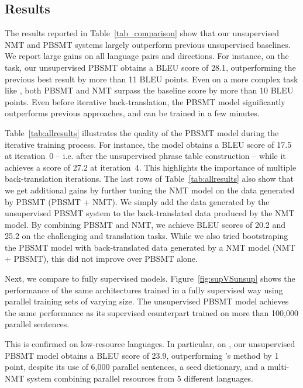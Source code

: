 \documentclass[11pt,a4paper]{article}
\begin{document}
\subsection{Results} \label{sec:results}

\insertmodelcomparisontable

\insertallresults
The results reported in Table~\ref{tab_comparison} show that our unsupervised NMT and PBSMT systems largely outperform previous unsupervised baselines. We report large gains on all language pairs and directions. For instance, on the  task, our unsupervised PBSMT obtains a BLEU score of 28.1, outperforming the previous best result by more than 11 BLEU points. Even on a more complex task like , both PBSMT and NMT surpass the baseline score by more than 10 BLEU points. Even before iterative back-translation, the PBSMT model significantly outperforms previous approaches, and can be trained in a few minutes.

Table~\ref{tab:allresults} illustrates the quality of the PBSMT model during the iterative training process. For instance, 
the  model obtains a BLEU score of 17.5 at iteration~0 -- i.e. after the unsupervised phrase table construction -- while it achieves a score of 27.2 at iteration~4. This highlights the importance of multiple back-translation iterations. The last rows of Table~\ref{tab:allresults} also show that we get additional gains by further tuning the NMT model on the data generated by PBSMT (PBSMT + NMT). We simply add the data generated by the unsupervised PBSMT system to the back-translated data produced by the NMT model. By combining PBSMT and NMT, we achieve BLEU scores of 20.2 and 25.2 on the challenging  and  translation tasks. While we also tried bootstraping the PBSMT model with back-translated data generated by a NMT model (NMT + PBSMT), this did not improve over PBSMT alone.

Next, we compare to fully supervised models. Figure~\ref{fig:supVSunsup} shows the performance of the same architectures trained in a fully supervised way using parallel training sets of varying size. The unsupervised PBSMT model achieves the same performance as its supervised counterpart trained on more than 100,000 parallel sentences.

This is confirmed on low-resource languages.
In particular, on , our unsupervised PBSMT model obtains a BLEU score of 23.9, outperforming \citet{gu18}'s method by 1 point, despite its use of 6,000 parallel sentences, a seed dictionary, and a multi-NMT system combining parallel resources from 5 different languages. 
\end{document}
